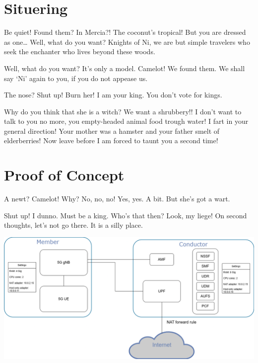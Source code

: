 \documentclass[a0,portrait]{hogent-poster}
\begin{document}
\begin{multicols}{2} %

\section{Situering}

Be quiet! Found them? In Mercia?! The coconut's tropical! But you are dressed as one… Well, what do you want? Knights of Ni, we are but simple travelers who seek the enchanter who lives beyond these woods.

Well, what do you want? It's only a model. Camelot! We found them. We shall say `Ni' again to you, if you do not appease us.

The nose? Shut up! Burn her! I am your king. You don't vote for kings.

Why do you think that she is a witch? We want a shrubbery!! I don't want to talk to you no more, you empty-headed animal food trough water! I fart in your general direction! Your mother was a hamster and your father smelt of elderberries! Now leave before I am forced to taunt you a second time!

\section{Proof of Concept}

A newt? Camelot! Why? No, no, no! Yes, yes. A bit. But she's got a wart.

Shut up! I dunno. Must be a king. Who's that then? Look, my liege! On second thoughts, let's not go there. It is a silly place.


\begin{center}
  \captionsetup{type=figure}
  \includegraphics[width=1.0\linewidth]{./graphics/POC-setup.png}
\end{center}



\end{multicols}
\end{document}

